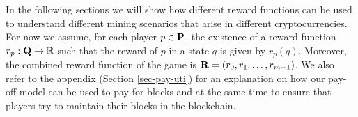 In the following sections we will show how different reward functions can be used to understand different mining scenarios that arise in different cryptocurrencies. 
For now we assume, for each player $p \in \mathbf{P}$, the existence of a reward function $r_p : \mathbf{Q} \to \mathbb{R}$ such that the reward of $p$ in a state $q$ is given by $r_p(q)$. Moreover, the combined reward function of the game is $\mathbf{R} = (r_0, r_1, \ldots, r_{m-1})$. We also refer to the appendix (Section \ref{sec-pay-uti}) for an explanation on how 
our pay-off model can be used to pay for blocks and at the same time to ensure that players try to maintain their blocks in the blockchain.







